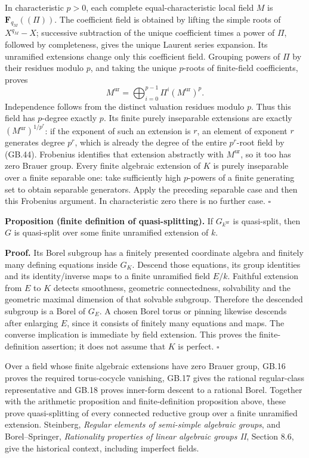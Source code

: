 \documentclass[
  11pt,
]{article}
\begin{document}
In characteristic \(p>0\), each complete equal-characteristic local
field \(M\) is \(\mathbf F_{q_M}((\Pi))\). The coefficient field is
obtained by lifting the simple roots of \(X^{q_M}-X\); successive
subtraction of the unique coefficient times a power of \(\Pi\), followed
by completeness, gives the unique Laurent series expansion. Its
unramified extensions change only this coefficient field. Grouping
powers of \(\Pi\) by their residues modulo \(p\), and taking the unique
\(p\)-roots of finite-field coefficients, proves \[
 M^{\mathrm{ur}}=\bigoplus_{i=0}^{p-1}
             \Pi^i(M^{\mathrm{ur}})^p.
 \tag{GB.44}
\] Independence follows from the distinct valuation residues modulo
\(p\). Thus this field has \(p\)-degree exactly \(p\). Its finite purely
inseparable extensions are exactly \((M^{\mathrm{ur}})^{1/p^r}\): if the
exponent of such an extension is \(r\), an element of exponent \(r\)
generates degree \(p^r\), which is already the degree of the entire
\(p^r\)-root field by (GB.44). Frobenius identifies that extension
abstractly with \(M^{\mathrm{ur}}\), so it too has zero Brauer group.
Every finite algebraic extension of \(K\) is purely inseparable over a
finite separable one: take sufficiently high \(p\)-powers of a finite
generating set to obtain separable generators. Apply the preceding
separable case and then this Frobenius argument. In characteristic zero
there is no further case. \(\square\)

\textbf{Proposition (finite definition of quasi-splitting).} If
\(G_{k^{\mathrm{ur}}}\) is quasi-split, then \(G\) is quasi-split over
some finite unramified extension of \(k\).

\textbf{Proof.} Its Borel subgroup has a finitely presented coordinate
algebra and finitely many defining equations inside \(G_K\). Descend
those equations, its group identities and its identity/inverse maps to a
finite unramified field \(E/k\). Faithful extension from \(E\) to \(K\)
detects smoothness, geometric connectedness, solvability and the
geometric maximal dimension of that solvable subgroup. Therefore the
descended subgroup is a Borel of \(G_E\). A chosen Borel torus or
pinning likewise descends after enlarging \(E\), since it consists of
finitely many equations and maps. The converse implication is immediate
by field extension. This proves the finite-definition assertion; it does
not assume that \(K\) is perfect. \(\square\)

Over a field whose finite algebraic extensions have zero Brauer group,
GB.16 proves the required torus-cocycle vanishing, GB.17 gives the
rational regular-class representative and GB.18 proves inner-form
descent to a rational Borel. Together with the arithmetic proposition
and finite-definition proposition above, these prove quasi-splitting of
every connected reductive group over a finite unramified extension.
Steinberg, \emph{Regular elements of semi-simple algebraic groups}, and
Borel--Springer, \emph{Rationality properties of linear algebraic groups
II}, Section 8.6, give the historical context, including imperfect
fields.
\end{document}

